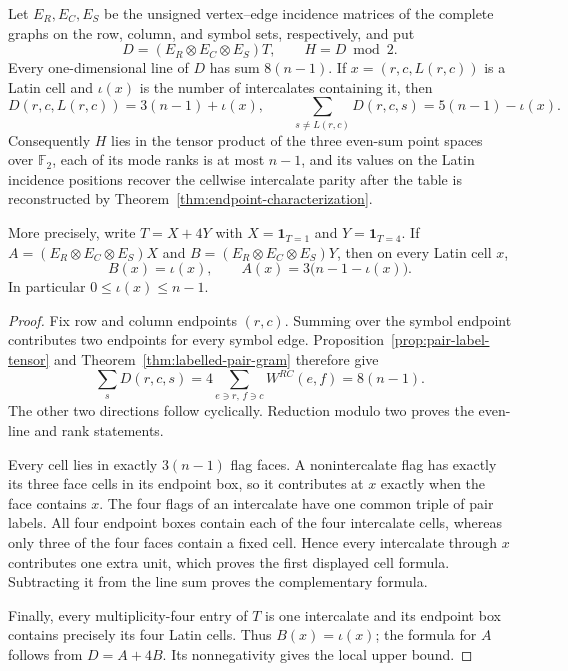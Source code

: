 \begin{theorem}
\label{thm:triple-endpoint-parity}
Let $E_R,E_C,E_S$ be the unsigned vertex--edge incidence matrices of the
complete graphs on the row, column, and symbol sets, respectively, and put
\[
 D=(E_R\otimes E_C\otimes E_S)T,
 \qquad H=D\bmod 2.
\]
Every one-dimensional line of $D$ has sum $8(n-1)$.  If
$x=(r,c,L(r,c))$ is a Latin cell and $\iota(x)$ is the number of
intercalates containing it, then
\[
 D(r,c,L(r,c))=3(n-1)+\iota(x),
 \qquad
 \sum_{s\ne L(r,c)}D(r,c,s)=5(n-1)-\iota(x).
\]
Consequently $H$ lies in the tensor product of the three even-sum point
spaces over $\mathbb F_2$, each of its mode ranks is at most $n-1$, and its
values on the Latin incidence positions recover the cellwise intercalate
parity after the table is reconstructed by
Theorem~\ref{thm:endpoint-characterization}.

More precisely, write $T=X+4Y$ with $X=\mathbf1_{T=1}$ and
$Y=\mathbf1_{T=4}$.  If
$A=(E_R\otimes E_C\otimes E_S)X$ and
$B=(E_R\otimes E_C\otimes E_S)Y$, then on every Latin cell $x$,
\[
 B(x)=\iota(x),\qquad A(x)=3\bigl(n-1-\iota(x)\bigr).
\]
In particular $0\leq\iota(x)\leq n-1$.
\end{theorem}

\begin{proof}
Fix row and column endpoints $(r,c)$.  Summing over the symbol endpoint
contributes two endpoints for every symbol edge.
Proposition~\ref{prop:pair-label-tensor} and
Theorem~\ref{thm:labelled-pair-gram} therefore give
\[
 \sum_sD(r,c,s)
 =4\sum_{e\ni r,\,f\ni c}W^{RC}(e,f)
 =8(n-1).
\]
The other two directions follow cyclically.  Reduction modulo two proves the
even-line and rank statements.

Every cell lies in exactly $3(n-1)$ flag faces.  A nonintercalate flag has
exactly its three face cells in its endpoint box, so it contributes at $x$
exactly when the face contains $x$.  The four flags of an intercalate have
one common triple of pair labels.  All four endpoint boxes contain each of
the four intercalate cells, whereas only three of the four faces contain a
fixed cell.  Hence every intercalate through $x$ contributes one extra unit,
which proves the first displayed cell formula.  Subtracting it from the line
sum proves the complementary formula.

Finally, every multiplicity-four entry of $T$ is one intercalate and its
endpoint box contains precisely its four Latin cells.  Thus
$B(x)=\iota(x)$; the formula for $A$ follows from $D=A+4B$.  Its
nonnegativity gives the local upper bound.
\end{proof}

